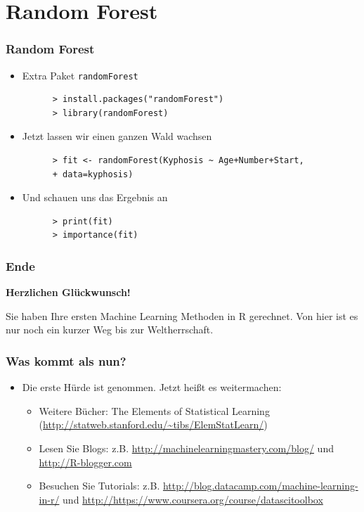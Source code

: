 \documentclass{beamer}
\begin{document}
\section{Random Forest}

\begin{frame}[fragile]
  \frametitle{Random Forest}
  \begin{itemize}
    \item Extra Paket \Verb+randomForest+
    \begin{Verbatim}
      > install.packages("randomForest")
      > library(randomForest)
    \end{Verbatim}
    \item Jetzt lassen wir einen ganzen Wald wachsen
    \begin{Verbatim}
      > fit <- randomForest(Kyphosis ~ Age+Number+Start,
      + data=kyphosis)
    \end{Verbatim}
    \item Und schauen uns das Ergebnis an
    \begin{Verbatim}
      > print(fit)
      > importance(fit)
    \end{Verbatim}
  \end{itemize}
\end{frame}

\begin{frame}[fragile]
  \frametitle{Ende}
  \begin{center}
    \LARGE \bfseries
    Herzlichen Glückwunsch!
  \end{center}
  \vspace{18pt}
  Sie haben Ihre ersten Machine Learning Methoden in R gerechnet. Von hier ist es nur noch ein kurzer Weg bis zur Weltherrschaft.
\end{frame}

\begin{frame}
  \frametitle{Was kommt als nun?}
  \begin{itemize}
    \item Die erste Hürde ist genommen. Jetzt heißt es weitermachen: 
        \begin{itemize}
        \item Weitere Bücher: The Elements of Statistical Learning (\url{http://statweb.stanford.edu/~tibs/ElemStatLearn/})
    \item Lesen Sie Blogs: z.B. \url{http://machinelearningmastery.com/blog/} und \url{http://R-blogger.com}
    \item Besuchen Sie Tutorials: z.B. \url{http://blog.datacamp.com/machine-learning-in-r/} und \url{http://https://www.coursera.org/course/datascitoolbox}
  \end{itemize}
  \end{itemize}
\end{frame}

\end{document}
